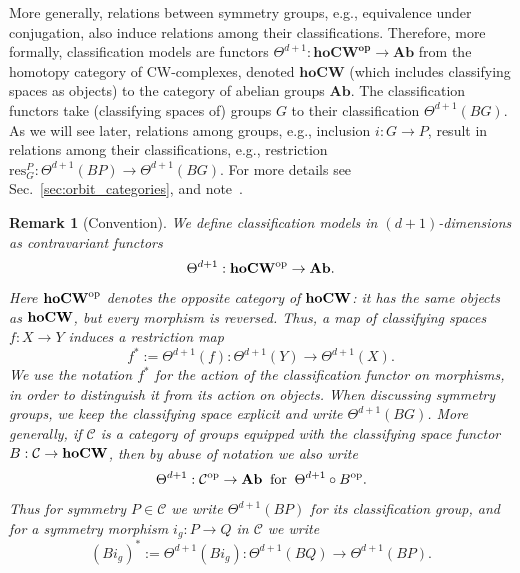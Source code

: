 \documentclass[aps,prx,reprint,superscriptaddress,twocolumn,amsmath,amssymb,amsfonts, nofootinbib]{revtex4-2}
\newcommand{\res}{\text{res}}
\theoremstyle{apsstyle}
\newtheorem{remark}[theorem]{Remark}
\begin{document}
\bigskip 


More generally, relations between symmetry groups, e.g., equivalence under conjugation, also induce relations among their classifications. Therefore, more formally, classification models are functors $\Theta^{d+1}: \mathbf{hoCW}^{\textbf{op}}\to \mathbf{Ab}$ from the homotopy category of CW-complexes, denoted $\mathbf{hoCW}$ (which includes classifying spaces as objects) to the category of abelian groups $\mathbf{Ab}$. The classification functors take (classifying spaces of) groups $G$ to their classification $\Theta^{d+1}(BG)$. As we will see later, relations among groups, e.g., inclusion $i: G\to P$, result in relations among their classifications, e.g., restriction $\res^{P}_{G}: \Theta^{d+1}(BP)\to \Theta^{d+1}(BG)$. For more details see Sec.~\ref{sec:orbit_categories}, and note~\cite{note_functor}. 

\bigskip 
\begin{remark}[Convention]
\label{rmk:convention}
We define classification models in $(d+1)$-dimensions as contravariant functors
\begin{equation*}
    \Theta^{d+1}: {\bf hoCW}^{\mathrm{op}} \to {\bf Ab}.
\end{equation*}
Here ${\bf hoCW}^{\mathrm{op}}$ denotes the opposite category of ${\bf hoCW}$: it has the same objects as ${\bf hoCW}$, but every morphism is reversed. Thus, a map of classifying spaces $f:X\to Y$ induces a restriction map
\begin{equation*}
    f^*:=\Theta^{d+1}(f):
    \Theta^{d+1}(Y)\longrightarrow\Theta^{d+1}(X).
\end{equation*}
We use the notation $f^*$ for the action of the classification functor
on morphisms, in order to distinguish it from its action on objects.
When discussing symmetry groups, we keep the classifying space explicit and write $\Theta^{d+1}(BG)$. More generally, if $\mathcal{C}$ is a category of groups equipped with the classifying space functor $B:\mathcal{C}\to {\bf hoCW}$, then by abuse of notation we also write
\begin{equation*}
    \Theta^{d+1}: \mathcal{C}^{\mathrm{op}} \to {\bf Ab}\;\;\text{for}\;\; \Theta^{d+1}\circ B^{\mathrm{op}}.
\end{equation*}
Thus for symmetry $P\in\mathcal{C}$ we write $\Theta^{d+1}(BP)$ for its classification group, and for a symmetry morphism $i_g:P\to Q$ in $\mathcal{C}$ we write
\begin{equation*}
    (Bi_g)^*:=
    \Theta^{d+1}(Bi_g):
    \Theta^{d+1}(BQ)\longrightarrow\Theta^{d+1}(BP).
\end{equation*}
\end{remark}
\end{document}
